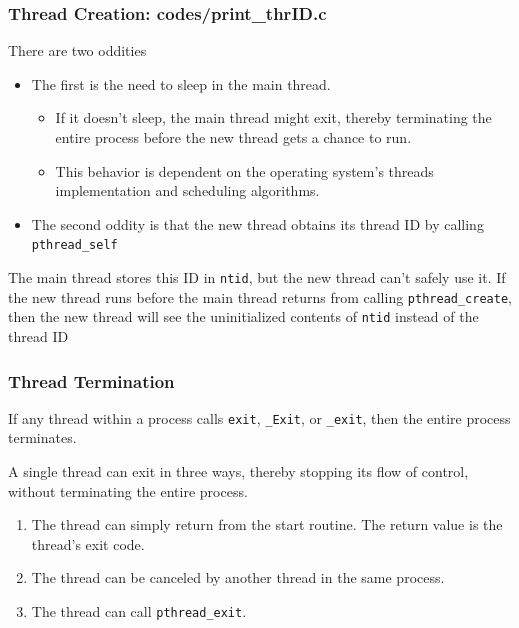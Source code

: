 \documentclass[newPxFont,sthlmFooter,nooffset]{beamer}
\begin{document}
\begin{frame}[t]
  \frametitle{Thread Creation: codes/print\_thrID.c}

There are two oddities
\begin{itemize}
\item The first is the need to sleep in the main thread. 
  \begin{itemize}
  \item If it doesn’t sleep, the main thread might exit, thereby
    terminating the entire process before the new thread gets a chance
    to run.
  \item This behavior is dependent on the operating system’s
    threads implementation and scheduling algorithms.
  \end{itemize}
\item The second oddity is that the new thread obtains its thread ID by calling \texttt{pthread\_self}
\end{itemize}

The main thread stores this ID in \texttt{ntid}, but the new thread can’t safely use it. If the new thread runs before the main thread returns from calling \texttt{pthread\_create}, then the new thread will see the uninitialized contents of \texttt{ntid} instead of the thread ID
  
\end{frame}


\begin{frame}[t]
  \frametitle{Thread Termination}
If any thread within a process calls \texttt{exit}, \texttt{\_Exit}, or \texttt{\_exit}, then the entire process terminates.  

 {A single thread can exit in three ways, thereby stopping its flow of control, without terminating the entire process.}
\begin{enumerate}
\item <2-> The thread can simply return from the start routine. The
  return value is the thread’s exit code.
\item <3-> The thread can be
  canceled by another thread in the same process.
\item  <4-> The thread can
  call \texttt{pthread\_exit}.
\end{enumerate}

\end{frame}
\end{document}
